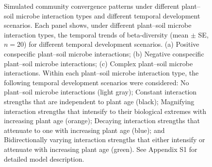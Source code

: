 \newpage
\begin{figure}[h]
	\centering
	\caption[Simulated community convergence patterns under different plant--soil microbe interaction types and different temporal development scenarios.]
		{\hspace{1mm} 
		Simulated community convergence patterns under different plant--soil microbe interaction types and different temporal development scenarios.
		Each panel shows, under different plant--soil microbe interaction types, the temporal trends of beta-diversity (mean $\pm$ SE, $n = 20$) for different temporal development scenarios.
		(a) Positive conspecific plant--soil microbe interactions; (b) Negative conspecific plant--soil microbe interactions; (c) Complex plant--soil microbe interactions.
		Within each plant--soil microbe interaction type, the following temporal development scenarios were considered: 
		No plant--soil microbe interactions (light gray); Constant interaction strengths that are independent to plant age (black); Magnifying interaction strengths that intensify to their biological extremes with increasing plant age (orange); Decaying interaction strengths that attenuate to one with increasing plant age (blue); and Bidirectionally varying interaction strengths that either intensify or attenuate with increasing plant age (green). See Appendix S1 for detailed model description.}
	\label{fig:SimulationAllPSF}
\end{figure}


